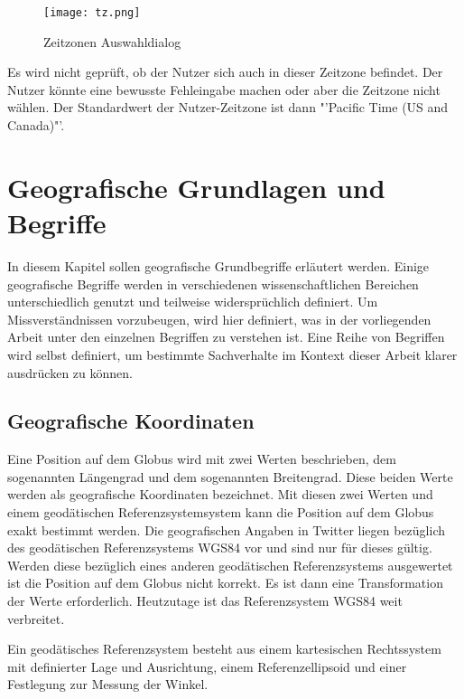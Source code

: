 				\begin{figure}[!ht]
					\begin{center}
						\texttt{[image: tz.png]}
						\caption{Zeitzonen Auswahldialog}
						\label{img:twitterTZ}
					\end{center}
				\end{figure}	

				Es wird nicht geprüft, ob der Nutzer sich auch in dieser Zeitzone befindet.
				Der Nutzer könnte eine bewusste Fehleingabe machen oder aber die Zeitzone nicht wählen.
				Der Standardwert der Nutzer-Zeitzone ist dann "'Pacific Time (US and Canada)"'.

	\section{Geografische Grundlagen und Begriffe}
	
		In diesem Kapitel sollen geografische Grundbegriffe erläutert werden. 
		Einige geografische Begriffe werden in verschiedenen wissenschaftlichen Bereichen unterschiedlich genutzt und teilweise widersprüchlich definiert. 
		Um Missverständnissen vorzubeugen, wird hier definiert, was in der vorliegenden Arbeit unter den einzelnen Begriffen zu verstehen ist.
		Eine Reihe von Begriffen wird selbst definiert, um bestimmte Sachverhalte im Kontext dieser Arbeit klarer ausdrücken zu können. 

		\subsection{Geografische Koordinaten} 

			Eine Position auf dem Globus wird mit zwei Werten beschrieben, dem sogenannten Längengrad und dem sogenannten Breitengrad.
			Diese beiden Werte werden als geografische Koordinaten bezeichnet. 
			Mit diesen zwei Werten und einem geodätischen Referenzsystemsystem kann die Position auf dem Globus exakt bestimmt werden.  
			Die geografischen Angaben in Twitter liegen bezüglich des geodätischen Referenzsystems WGS84 vor und sind nur für dieses gültig.
			Werden diese bezüglich eines anderen geodätischen Referenzsystems ausgewertet ist die Position auf dem Globus nicht korrekt.
			Es ist dann eine Transformation der Werte erforderlich.
			Heutzutage ist das Referenzsystem WGS84 weit verbreitet.

			Ein geodätisches Referenzsystem besteht aus einem kartesischen Rechtssystem mit definierter Lage und Ausrichtung, einem Referenzellipsoid und einer Festlegung zur Messung der Winkel.

